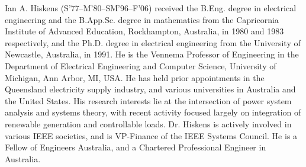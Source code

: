 \documentclass[journal,twoside]{IEEEtran}
\begin{document}
\begin{IEEEbiography}{Ian A. Hiskens}
(S'77--M'80--SM'96--F'06) received the B.Eng. degree in electrical engineering and the B.App.Sc. degree in mathematics from the Capricornia Institute of Advanced Education, Rockhampton,
Australia, in 1980 and 1983 respectively, and the Ph.D. degree in electrical engineering from
the University of Newcastle, Australia, in 1991. He is the Vennema Professor of Engineering
in the Department of Electrical Engineering and Computer Science, University of Michigan, Ann
Arbor, MI, USA. He has held prior appointments in the Queensland electricity supply industry, and various universities in Australia and the United States. His research interests lie at the intersection of power system analysis and systems theory, with recent activity focused largely on
integration of renewable generation and controllable loads. Dr. Hiskens is actively involved in various IEEE societies, and is VP-Finance of the IEEE Systems Council. He is a Fellow of Engineers Australia, and a Chartered Professional Engineer in Australia.
\end{IEEEbiography}









\end{document}
